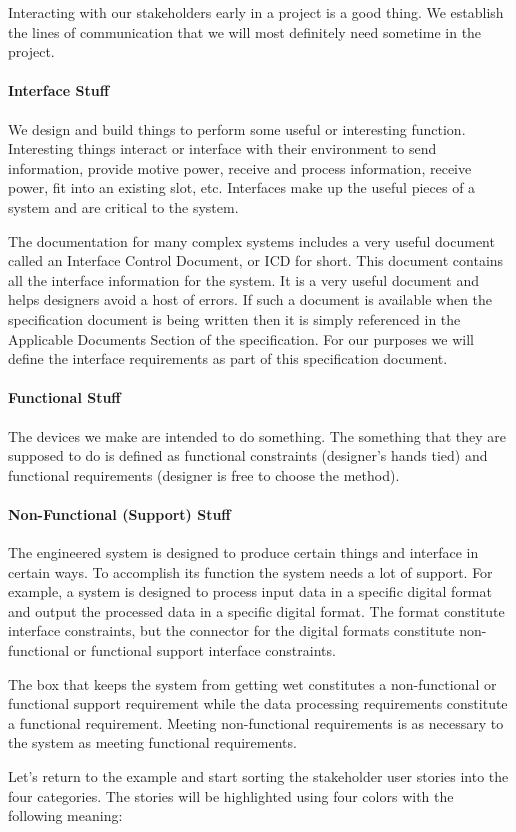\begin{slshape}
Interacting with our stakeholders early in a project is a good thing.  We establish the lines of communication that we will most definitely need sometime in the project.
\bigskip

\paragraph*{Interface Stuff}

We design and build things to perform some useful or interesting function.  Interesting things interact or interface with their environment to send information, provide motive power, receive and process information, receive power, fit into an existing slot, etc.  Interfaces make up the useful pieces of a system and are critical to the system.
\bigskip

The documentation for many complex systems includes a very useful document called an Interface Control Document, or ICD for short.  This document contains all the interface information for the system.  It is a very useful document and helps designers avoid a host of errors.  If such a document is available when the specification document is being written then it is simply referenced in the Applicable Documents Section of the specification.  For our purposes we will define the interface requirements as part of this specification document.
\bigskip

\paragraph*{Functional Stuff}

The devices we make are intended to do something.  The something that they are supposed to do is defined as functional constraints (designer's hands tied) and functional requirements (designer is free to choose the method).
\bigskip


\paragraph*{Non-Functional (Support) Stuff}

The engineered system is designed to produce certain things and interface in certain ways.  To accomplish its function the system needs a lot of support.  For example, a system is designed to process input data in a specific digital format and output the processed data in a specific digital format.  The format constitute interface constraints, but the connector for the digital formats constitute non-functional or functional support interface constraints.
\bigskip

The box that keeps the system from getting wet constitutes a non-functional or functional support requirement while the data processing requirements constitute a functional requirement.  Meeting non-functional requirements is as necessary to the system as meeting functional requirements.
\bigskip

Let's return to the example and start sorting the stakeholder user stories into the four categories.  The stories will be highlighted using four colors with the following meaning:
\bigskip

\end{slshape}

